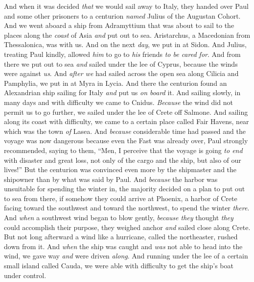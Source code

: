 \begin{biblechapter} %
 And when it was decided \textit{that} we would sail away to Italy, they handed over Paul and some other prisoners to a centurion \textit{named} Julius of the Augustan Cohort.
\verse And we went aboard a ship from Adramyttium that was about to sail to the places along the \textit{coast} of Asia \textit{and} put out to sea. Aristarchus, a Macedonian from Thessalonica, was with us.
\verse And on the next \textit{day}, we put in at Sidon. And Julius, treating Paul kindly, allowed \textit{him} to go to \textit{his} friends \textit{to be cared for}.
\verse And from there we put out to sea \textit{and} sailed under the lee of Cyprus, because the winds were against \textit{us}.
\verse And \textit{after we} had sailed across the open sea along Cilicia and Pamphylia, we put in at Myra in Lycia.
\verse And there the centurion found an Alexandrian ship sailing for Italy \textit{and} put us \textit{on board} it.
\verse And sailing slowly, in many days and with difficulty we came to Cnidus. \textit{Because} the wind did not permit us to go further, we sailed under the lee of Crete off Salmone.
\verse And sailing along its coast with difficulty, we came to a certain place called Fair Havens, near which was the town \textit{of} Lasea.
\verse And \textit{because} considerable time had passed and the voyage was now dangerous because even the Fast was already over, Paul strongly recommended,
\verse saying to them, “Men, I perceive that the voyage is going \textit{to end} with disaster and great loss, not only of the cargo and the ship, but also of our lives!”
\verse But the centurion was convinced even more by the shipmaster and the shipowner than by what was said by Paul.
\verse And \textit{because} the harbor was unsuitable for spending the winter in, the majority decided on a plan to put out to sea from there, if somehow they could arrive at Phoenix, a harbor of Crete facing toward the southwest and toward the northwest, to spend the winter \textit{there}.
 And \textit{when} a southwest wind began to blow gently, \textit{because they} thought \textit{they} could accomplish their purpose, they weighed anchor \textit{and} sailed close along Crete.
\verse But not long afterward a wind like a hurricane, called the northeaster, rushed down from it.
\verse And \textit{when} the ship was caught and \textit{was} not able to head into the wind, we gave way \textit{and} were driven \textit{along}.
\verse And running under the lee of a certain small island called Cauda, we were able with difficulty to get the ship’s boat under control.

\end{biblechapter}
